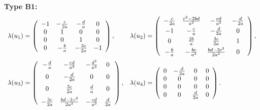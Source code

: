 \documentclass{amsart}
\theoremstyle{plain}
\theoremstyle{remark}
\begin{document}
{\smallskip\noindent
{\bf Type B1:}
{\small \begin{equation}\label{lambdaB1}
\begin{array}{ll}
\lambda(u_1)=\left(  \begin {array}{cccc} -1&-{\frac {c}{2a}}&-{\frac {d}{a}}&0\\0&1&0&0\\0&0&1&0\\0&-{\frac {b}{a}}&-{\frac {3c}{2a}}&-1\end {array} \right) , &\lambda(u_2)=\left( \begin {array}{cccc} -{\frac {c}{2a}}&{\frac {{c}^{2}-2bd}{{a}^{2}}}&-{\frac {cd}{{a}^{2}}}&-{\frac {d}{2a}}\\\noalign{\smallskip}-1&-{\frac {c}{a}}&-{\frac {d}{2a}}&0\\\noalign{\smallskip}0&{\frac {2b}{a}}&{\frac {3c}{2a}}&1\\\noalign{\smallskip}-{\frac {b}{a}}&-{\frac {bc}{{a}^{2}}}&{\frac {bd-3{c}^{2}}{2{a}^{2}}}&0\end {array} \right), 
\vspace{2mm} \\
\lambda(u_3)=\left( \begin {array}{cccc} -{\frac {d}{a}}&-{\frac {cd}{{a}^{2}}}&-{\frac {{d}^{2}}{{a}^{2}}}&0\\\noalign{\medskip}0&-{\frac {d}{2a}}&0&0\\\noalign{\medskip}0&{\frac {3c}{2a}}&{\frac {d}{a}}&0\\\noalign{\medskip}-{\frac {3c}{2a}}&{\frac {bd-3\,{c}^{2}}{2{a}^{2}}}&-{\frac {cd}{{a}^{2}}}&{\frac {d}{2a}}\end {array} \right), &\lambda(u_4)=\left( \begin {array}{cccc} 0&-{\frac {d}{2a}}&0&0\\ 0&0&0&0\\0&0&0&0\\0&0&{\frac {d}{2a}}&0\end {array} \right). 
\end{array}\end{equation}
%
\begin{equation}\label{RB1}
\begin{array}{ll}

\end{array}
\end{equation}}}
\end{document}
